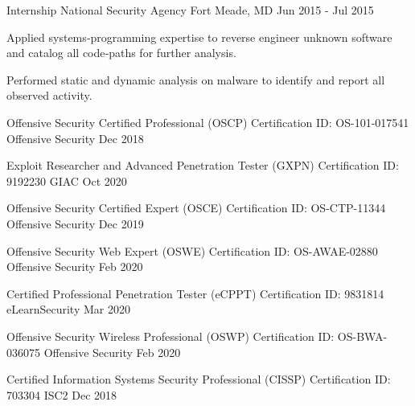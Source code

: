 \documentclass[11pt, letterpaper]{awesome-cv}
\begin{document}
\begin{cventries}
  \cventry
    {Internship}
    {National Security Agency}
    {Fort Meade, MD}
    {Jun 2015 - Jul 2015}
    {
      \begin{cvitems}
        \item{Applied systems‑programming expertise to reverse engineer unknown software and catalog all code‑paths for further analysis.}
        \item{Performed static and dynamic analysis on malware to identify and report all observed activity.}
      \end{cvitems}
    }



\end{cventries}

\begin{cvhonors}

  \cvhonor
    {Offensive Security Certified Professional (OSCP)}
    {Certification ID: OS-101-017541}
    {Offensive Security}
    {Dec 2018}

  \cvhonor
    {Exploit Researcher and Advanced Penetration Tester (GXPN)}
    {Certification ID: 9192230}
    {GIAC}
    {Oct 2020}

  \cvhonor
    {Offensive Security Certified Expert (OSCE)}
    {Certification ID: OS-CTP-11344}
    {Offensive Security}
    {Dec 2019}

  \cvhonor
    {Offensive Security Web Expert (OSWE)}
    {Certification ID: OS-AWAE-02880}
    {Offensive Security}
    {Feb 2020}

  \cvhonor
    {Certified Professional Penetration Tester (eCPPT)}
    {Certification ID: 9831814}
    {eLearnSecurity}
    {Mar 2020}

  \cvhonor
    {Offensive Security Wireless Professional (OSWP)}
    {Certification ID: OS-BWA-036075}
    {Offensive Security}
    {Feb 2020}

  \cvhonor
    {Certified Information Systems Security Professional (CISSP)}
    {Certification ID: 703304}
    {ISC2}
    {Dec 2018}


\end{cvhonors}
\end{document}
